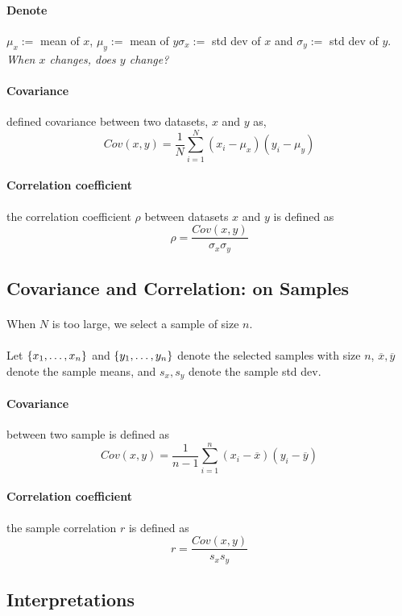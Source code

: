 \documentclass{article}
\begin{document}
		\paragraph{Denote} $\mu_x:=$ mean of $x$, $\mu_y:=$ mean of $y$\newline $\sigma_x:=$ std dev of $x$ and $\sigma_y:=$ std dev of $y$.
		\emph{When $x$ changes, does $y$ change?}
		\paragraph{Covariance} defined covariance between two datasets, $x$ and $y$ as,
			\[
				Cov(x,y) = \frac{1}{N}\sum_{i=1}^N{(x_i - \mu_x)(y_i - \mu_y)}
			\]
		\paragraph{Correlation coefficient} the correlation coefficient $\rho$ between datasets $x$ and $y$ is defined as
			\[
				\rho = \frac{Cov(x,y)}{\sigma_x \sigma_y}
			\]
			
		\subsection{Covariance and Correlation: on Samples}
		\paragraph{} When $N$ is too large, we select a sample of size $n$.
		\paragraph{} Let $\{{{x}_{1}}, \dots, {{x}_{n}}\}$ and $\{{{y}_{1}}, \dots, {{y}_{n}}\}$ denote the selected samples with size $n$, $\overline{x}, \overline{y}$ denote the sample means, and $s_x, s_y$ denote the sample std dev.
		\paragraph{Covariance} between two sample is defined as
			\[
				Cov(x,y) = \frac{1}{n-1}\sum_{i=1}^n{(x_i - \overline{x})(y_i - \overline{y})}
			\]
		\paragraph{Correlation coefficient} the sample correlation $r$ is defined as
			\[
				r = \frac{Cov(x,y)}{s_x s_y}
			\]
		\subsection{Interpretations}
\end{document}
